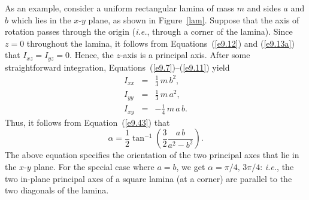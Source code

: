 As an example, consider a uniform rectangular lamina of mass $m$ and sides $a$ and $b$ which lies
in the $x$-$y$ plane, as shown in Figure~\ref{lam}. Suppose that the axis of
rotation passes through the origin ({\em i.e.}, through a corner of the lamina).
Since $z=0$ throughout the lamina, it follows from Equations~(\ref{e9.12}) and
(\ref{e9.13a}) that $I_{xz}= I_{yz} = 0$.  Hence, the $z$-axis
is a principal axis. After some straightforward integration, Equations~(\ref{e9.7})--(\ref{e9.11}) yield
\begin{eqnarray}
I_{xx} &=& \frac{1}{3}\,m\,b^2,\\[0.5ex]
I_{yy} &=& \frac{1}{3}\,m\,a^2,\\[0.5ex]
I_{xy} &=& - \frac{1}{4}\,m\,a\,b.
\end{eqnarray}
Thus, it follows from Equation~(\ref{e9.43}) that
\begin{equation}
\alpha = \frac{1}{2}\tan^{-1}\left(\frac{3}{2}\frac{a\,b}{a^2-b^2}\right).
\end{equation}
The above equation specifies the orientation of the two principal axes that
lie in the $x$-$y$ plane.
For the special case where $a=b$, we get  $\alpha=\pi/4,\,
3\pi/4$: {\em i.e.}, the two in-plane principal axes of a square lamina (at a corner) are parallel to the two diagonals of the
lamina.

